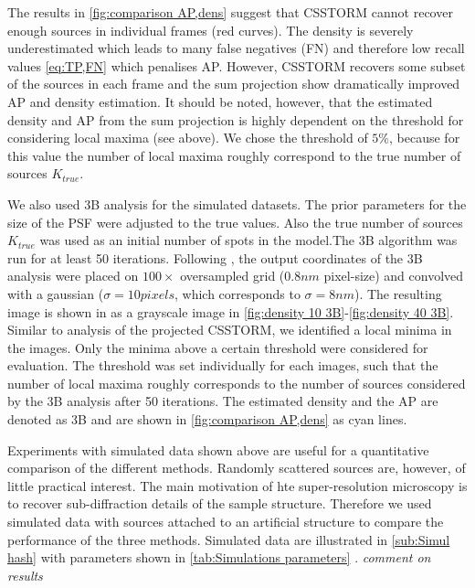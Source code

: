 The results in \autoref{fig:comparison AP,dens} suggest that CSSTORM cannot recover enough sources in individual frames (red curves). The density is severely underestimated which leads to many false negatives (FN) and therefore low recall values \autoref{eq:TP,FN} which penalises AP. However, CSSTORM recovers some subset of the sources in each frame and the sum projection show dramatically improved AP and density estimation. It should be noted, however, that the estimated density and AP from the sum projection is highly dependent on the threshold for considering local maxima (see above). We chose the threshold of $5\%$, because for this value the number of local maxima roughly correspond to the true number of sources $K_{true}$.

We also used 3B analysis for the simulated datasets. The prior parameters for the size of the PSF were adjusted to the true values. Also the true number of sources $K_{true}$ was used as an initial number of spots in the model.The 3B algorithm was run for at least 50 iterations. Following \cite{Cox2011}, the output coordinates of the 3B analysis were placed on $100\times$ oversampled grid ($0.8\unit{nm}$ pixel-size) and convolved with a gaussian ($\sigma=10\unit{pixels}$, which corresponds to $\sigma=8\unit{nm}$). The resulting image is shown in as a grayscale image in \autoref{fig:density 10 3B}-\ref{fig:density 40 3B}. Similar to analysis of the projected CSSTORM, we identified a local minima in the images. Only the minima above a certain threshold were considered for evaluation. The threshold was set individually for each images, such that the number of local maxima roughly corresponds to the number of sources considered by the 3B analysis after 50 iterations. The estimated density and the AP are denoted as \textsf{3B} and are shown in \autoref{fig:comparison AP,dens} as cyan lines. 

Experiments with simulated data shown above are useful for a quantitative comparison of the different methods. Randomly scattered sources are, however, of little practical interest. The main motivation of hte super-resolution microscopy is to recover sub-diffraction details of the sample structure. Therefore we used simulated data with sources attached to an artificial structure to compare the performance of the three methods. Simulated data are illustrated in \autoref{sub:Simul hash} with parameters shown in  \autoref{tab:Simulations parameters} .
\fix \emph{comment on results}


